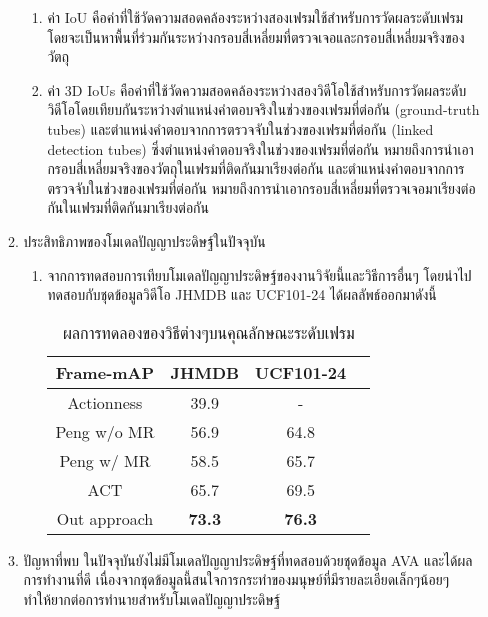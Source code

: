 \begin{enumerate}
\begin{enumerate}
		\begin{enumerate}
			\item ค่า IoU คือค่าที่ใช้วัดความสอดคล้องระหว่างสองเฟรมใช้สำหรับการวัดผลระดับเฟรม โดยจะเป็นหาพื้นที่ร่วมกันระหว่างกรอบสี่เหลี่ยมที่ตรวจเจอและกรอบสี่เหลี่ยมจริงของวัตถุ
			\item ค่า 3D IoUs คือค่าที่ใช้วัดความสอดคล้องระหว่างสองวิดีโอใช้สำหรับการวัดผลระดับวิดีโอโดยเทียบกันระหว่างตำแหน่งคำตอบจริงในช่วงของเฟรมที่ต่อกัน (ground-truth tubes) 
			และตำแหน่งคำตอบจากการตรวจจับในช่วงของเฟรมที่ต่อกัน (linked detection tubes) ซึ่งตำแหน่งคำตอบจริงในช่วงของเฟรมที่ต่อกัน หมายถึงการนำเอากรอบสี่เหลี่ยมจริงของวัตถุในเฟรมที่ติดกันมาเรียงต่อกัน 
			และตำแหน่งคำตอบจากการตรวจจับในช่วงของเฟรมที่ต่อกัน หมายถึงการนำเอากรอบสี่เหลี่ยมที่ตรวจเจอมาเรียงต่อกันในเฟรมที่ติดกันมาเรียงต่อกัน
		\end{enumerate}
		\item ประสิทธิภาพของโมเดลปัญญาประดิษฐ์ในปัจจุบัน
		\begin{enumerate}
			\item จากการทดสอบการเทียบโมเดลปัญญาประดิษฐ์ของงานวิจัยนี้และวิธีการอื่นๆ โดยนำไปทดสอบกับชุดข้อมูลวิดีโอ JHMDB และ UCF101-24 ได้ผลลัพธ์ออกมาดังนี้
			\begin{table}[!ht]
				\centering
				\begin{tabular}{|c|c|c|c|}
					\hline
					{Frame-mAP}&{JHMDB}&{UCF101-24}\\
					\hline
					Actionness 			& 39.9				& 	-						\\
					Peng w/o MR			& 56.9				& 64.8						\\
					Peng w/  MR 		& 58.5				& 65.7						\\
					ACT					& 65.7				& 69.5						\\
					\hline
					Out approach		& \textbf{73.3}		& \textbf{76.3}				\\
					\hline
				\end{tabular}
				\caption{ผลการทดลองของวิธีต่างๆบนคุณลักษณะระดับเฟรม}
				\label{tab: transfer learning}
			\end{table}
		\end{enumerate}
		\item ปัญหาที่พบ
		ในปัจจุบันยังไม่มีโมเดลปัญญาประดิษฐ์ที่ทดสอบด้วยชุดข้อมูล AVA และได้ผลการทำงานที่ดี เนื่องจากชุดข้อมูลนี้สนใจการกระทำของมนุษย์ที่มีรายละเอียดเล็กๆน้อยๆ 
		ทำให้ยากต่อการทำนายสำหรับโมเดลปัญญาประดิษฐ์
	\end{enumerate}
\end{enumerate}
\clearpage

